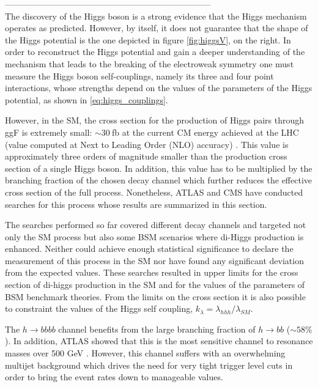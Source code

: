 ------------------------------------------------------------------------ \\
The discovery of the Higgs boson is a strong evidence that the Higgs mechanism operates as predicted. However, by itself, it does not guarantee that the shape of the Higgs potential is the one depicted in figure \ref{fig:higgsV}, on the right. In order to reconstruct the Higgs potential and gain a deeper understanding of the mechanism that leads to the breaking of the electroweak symmetry one must measure the Higgs boson self-couplings, namely its three and four point interactions, whose strengths depend on the values of the parameters of the Higgs potential, as shown in \ref{eq:higgs_couplings}.  

However, in the SM, the cross section for the production of Higgs pairs through ggF is extremely small: $\sim30~$fb at the current CM energy achieved at the LHC (value computed at Next to Leading Order (NLO) accuracy) \cite{higgsCrossSection}. This value is approximately three orders of magnitude smaller than the production cross section of a single Higgs boson. In addition, this value has to be multiplied by the branching fraction of the chosen decay channel which further reduces the effective cross section of the full process. Nonetheless, ATLAS and CMS have conducted searches for this process whose results are summarized in this section.

The searches performed so far covered different decay channels and targeted not only the SM process but also some BSM scenarios where di-Higgs production is enhanced. Neither could achieve enough statistical significance to declare the measurement of this process in the SM nor have found any significant deviation from the expected values. These searches resulted in upper limits for the cross section of di-higgs production in the SM and for the values of the parameters of BSM benchmark theories. From the limits on the cross section it is also possible to constraint the values of the Higgs self coupling, $k_{\lambda}=\lambda_{hhh}/\lambda_{SM}$.

The $h\rightarrow bbbb$ channel \cite{hh2bbbbATLAS,hh2bbbbCMS} benefits from the large branching fraction of $h\rightarrow bb$ ($\sim 58 \%$). In addition, ATLAS showed that this is the most sensitive channel to resonance masses over 500 GeV \cite{hhATLAS}. However, this channel suffers with an overwhelming multijet background which drives the need for very tight trigger level cuts in order to bring the event rates down to manageable values.

